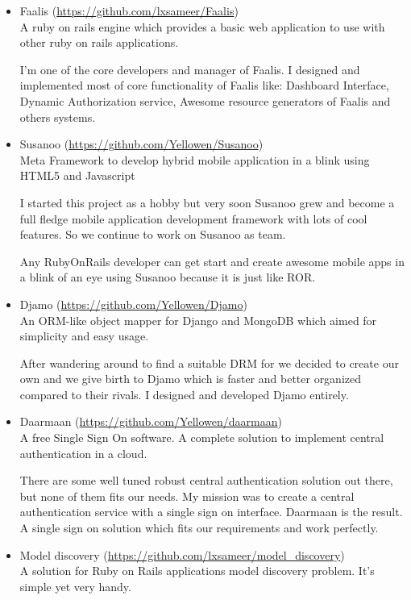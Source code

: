 \documentclass[a4paper,11pt]{article}
\begin{document}
\begin{itemize}

\item Faalis (\url{https://github.com/lxsameer/Faalis})\\
  A ruby on rails engine which provides a basic web application to
  use with other ruby on rails applications.

I'm one of the core developers and manager of Faalis. I designed and implemented most
of core functionality of Faalis like: Dashboard Interface, Dynamic Authorization service,
Awesome resource generators of Faalis and others systems.

\item Susanoo (\url{https://github.com/Yellowen/Susanoo})\\
  Meta Framework to develop hybrid mobile application in a blink using
  HTML5 and Javascript

  I started this project as a hobby but very soon Susanoo grew and become
  a full fledge mobile application development framework with lots of cool
  features. So we continue to work on Susanoo as team.

  Any RubyOnRails developer can get start and create awesome mobile apps
  in a blink of an eye using Susanoo because it is just like ROR.

\item Djamo (\url{https://github.com/Yellowen/Djamo})\\
  An ORM-like object mapper for Django and MongoDB which aimed for
  simplicity and easy usage.

  After wandering around to find a suitable DRM for we decided to create our
  own and we give birth to Djamo which is faster and better organized compared
  to their rivals. I designed and developed Djamo entirely.

\item Daarmaan (\url{https://github.com/Yellowen/daarmaan})\\
  A free Single Sign On software. A complete solution to implement
  central authentication in a cloud.

  There are some well tuned robust central authentication solution
  out there, but none of them fits our needs. My mission was to create
  a central authentication service with a single sign on interface.
  Daarmaan is the result. A single sign on solution which fits our
  requirements and work perfectly.

\item Model discovery (\url{https://github.com/lxsameer/model_discovery})\\
  A solution for Ruby on Rails applications model discovery problem.
  It's simple yet very handy.


\end{itemize}
\end{document}
